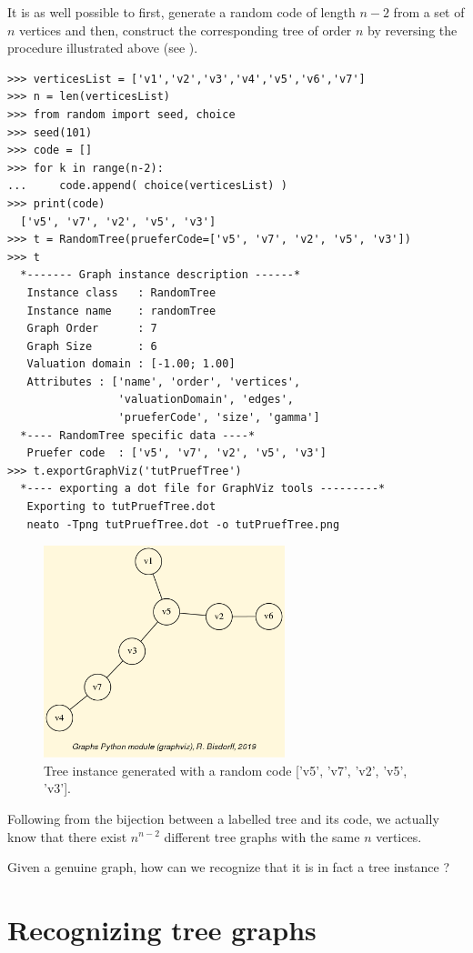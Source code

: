It is as well possible to first, generate a random \Pruefer code of length $n-2$ from a set of $n$ vertices and then, construct the corresponding tree of order $n$ by reversing the procedure illustrated above (see \citep{BAR-1991}).
\begin{lstlisting}
>>> verticesList = ['v1','v2','v3','v4','v5','v6','v7']
>>> n = len(verticesList)
>>> from random import seed, choice
>>> seed(101)
>>> code = []
>>> for k in range(n-2):
...     code.append( choice(verticesList) )
>>> print(code)
  ['v5', 'v7', 'v2', 'v5', 'v3']
>>> t = RandomTree(prueferCode=['v5', 'v7', 'v2', 'v5', 'v3'])
>>> t
  *------- Graph instance description ------*
   Instance class   : RandomTree
   Instance name    : randomTree
   Graph Order      : 7
   Graph Size       : 6
   Valuation domain : [-1.00; 1.00]
   Attributes : ['name', 'order', 'vertices',
                 'valuationDomain', 'edges',
                 'prueferCode', 'size', 'gamma']
  *---- RandomTree specific data ----*
   Pruefer code  : ['v5', 'v7', 'v2', 'v5', 'v3']
>>> t.exportGraphViz('tutPruefTree')
  *---- exporting a dot file for GraphViz tools ---------*
   Exporting to tutPruefTree.dot
   neato -Tpng tutPruefTree.dot -o tutPruefTree.png
\end{lstlisting}
\begin{figure}[h]
\sidecaption
\includegraphics[width=7cm]{Figures/tutPruefTree.png}
\caption{Tree instance generated with a random \Pruefer code ['v5', 'v7', 'v2', 'v5', 'v3'].} 
\label{fig:23.2}       %
\end{figure}

Following from the bijection between a labelled tree and its \Pruefer code, we actually know that there exist $n^{n-2}$ different tree graphs with the same $n$ vertices.

Given a genuine graph, how can we recognize that it is in fact a tree instance ?

\section{Recognizing tree graphs}
\label{sec:23.2}

